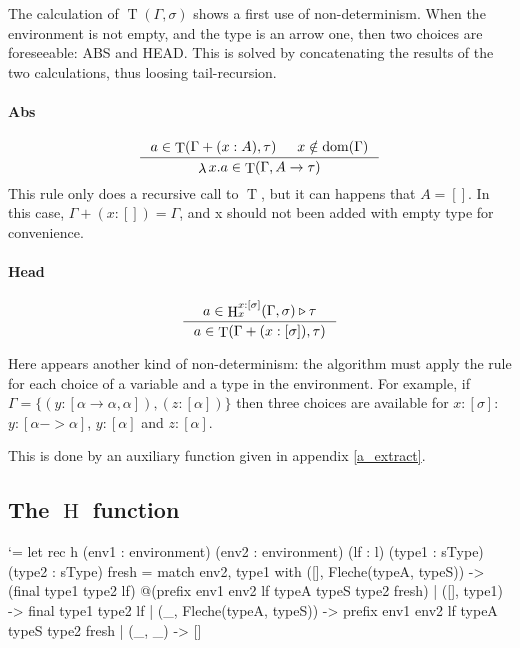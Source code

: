 \documentclass{article}
\let\origlstlisting=\lstlisting
\let\endoriglstlisting=\endlstlisting
\renewenvironment{lstlisting}
{\mathcode`\-=\hyphenmathcode
    \everymath{}\mathsurround=0pt\origlstlisting}
{\endoriglstlisting}
\DeclareMathOperator{\iT}{T}
\DeclareMathOperator{\iH}{H}
\DeclareMathOperator{\iDom}{dom}
\DeclareMathOperator{\iLambda}{\lambda}
\begin{document}
The calculation of $\iT(\Gamma, \sigma)$ shows a first use of non-determinism. When the environment is not empty, and the type is an arrow one, then two choices are foreseeable: ABS and HEAD.  This is solved by concatenating the results of the two calculations, thus loosing tail-recursion.

\paragraph{Abs}
\begin{displaymath}
    \inference[]{a \in \iT(\Gamma + (x : A), \tau) & x \notin \iDom(\Gamma)}{\iLambda x.a \in \iT(\Gamma, A \rightarrow \tau)}
\end{displaymath}
This rule only does a recursive call to $\iT$, but it can happens that $A = []$. In this case, $\Gamma + (x : []) = \Gamma$, and x should not been added with empty type for convenience. 

\paragraph{Head}
\begin{displaymath}
    \inference[]{a \in \iH^{x:[\sigma]}_x(\Gamma, \sigma) \triangleright \tau}{a \in\iT(\Gamma + (x:[\sigma]), \tau) }
\end{displaymath}

Here appears another kind of non-determinism: the algorithm must apply the rule for each choice of a variable and a type in the environment. For example, if $\Gamma = \{(y : [\alpha \rightarrow \alpha, \alpha]), (z : [\alpha])\}$ then three choices are available for $x:[\sigma]$: $y : [\alpha -> \alpha]$, $y : [\alpha]$ and $z : [\alpha]$.

This is done by an auxiliary function given in appendix \ref{a_extract}.

\subsection{The $\iH$ function}
\begin{lstlisting}
let rec h (env1 : environment) (env2 : environment)
    (lf : l) (type1 : sType) (type2 : sType) fresh =
  match env2, type1 with
    ([], Fleche(typeA, typeS)) -> 
        (final type1 type2 lf)
            @(prefix env1 env2 lf typeA typeS type2 fresh)
    | ([], type1) -> final type1 type2 lf
    | (_, Fleche(typeA, typeS)) -> 
        prefix env1 env2 lf typeA typeS type2 fresh
    | (_, _) -> []
\end{lstlisting}
\end{document}
